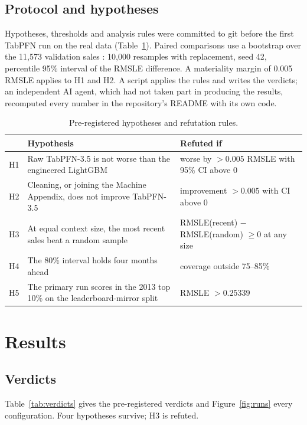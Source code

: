 \documentclass[11pt,a4paper]{article}
\begin{document}
\subsection{Protocol and hypotheses}

Hypotheses, thresholds and analysis rules were committed to git before the first TabPFN run on the real data (Table~\ref{tab:hyp}). Paired comparisons use a bootstrap over the 11,573 validation sales \cite{efron1993}: 10,000 resamples with replacement, seed 42, percentile 95\% interval of the RMSLE difference. A materiality margin of 0.005 RMSLE applies to H1 and H2. A script applies the rules and writes the verdicts; an independent AI agent, which had not taken part in producing the results, recomputed every number in the repository's README with its own code.

\begin{table}[H]
\centering\small
\caption{Pre-registered hypotheses and refutation rules.}
\label{tab:hyp}
\begin{tabular}{lp{7.2cm}p{5.6cm}}
\toprule
 & Hypothesis & Refuted if \\
\midrule
H1 & Raw TabPFN-3.5 is not worse than the engineered LightGBM & worse by $>0.005$ RMSLE with 95\% CI above 0 \\
H2 & Cleaning, or joining the Machine Appendix, does not improve TabPFN-3.5 & improvement $>0.005$ with CI above 0 \\
H3 & At equal context size, the most recent sales beat a random sample & RMSLE(recent) $-$ RMSLE(random) $\geq 0$ at any size \\
H4 & The 80\% interval holds four months ahead & coverage outside 75--85\% \\
H5 & The primary run scores in the 2013 top 10\% on the leaderboard-mirror split & RMSLE $>0.25339$ \\
\bottomrule
\end{tabular}
\end{table}

\section{Results}

\subsection{Verdicts}

Table~\ref{tab:verdicts} gives the pre-registered verdicts and Figure~\ref{fig:runs} every configuration. Four hypotheses survive; H3 is refuted.
\end{document}
